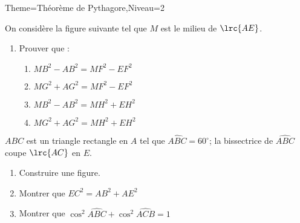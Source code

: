 \documentclass[a4paper,12pt]{article}
\begin{document}
\begin{Maquette}[Fiche]{Theme=Théorème de Pythagore,Niveau=2}
\begin{exercice}
\begin{minipage}{0.5\linewidth}
On considère la figure suivante tel que $M$ est le milieu de $\lrc{AE}$.
\begin{enumerate}
\item Prouver que :
\begin{enumerate}
\item $MB^{2}-AB^{2}=MF^{2}-EF^{2}$
\item $MG^{2}+AG^{2}=MF^{2}-EF^{2}$
\item $MB^{2}-AB^{2}=MH^{2}+EH^{2}$
\item $MG^{2}+AG^{2}=MH^{2}+EH^{2}$
\end{enumerate}
\end{enumerate}
\end{minipage}\hfill
\begin{minipage}{0.4\linewidth}
\end{minipage}
\end{exercice}

\begin{exercice}
$ABC$ est un triangle rectangle en $A$ tel que $\widehat{ABC}=60^{\circ}$; la bissectrice de $\widehat{ABC}$ coupe $\lrc{AC}$ en $E$.
\begin{enumerate}
\item Construire une figure.
\item Montrer que $EC^{2}=AB^{2}+AE^{2}$
\item Montrer que $\cos^{2}\widehat{ABC}+\cos^{2}\widehat{ACB}=1$
\end{enumerate}
\end{exercice}


\end{Maquette}
\end{document}
